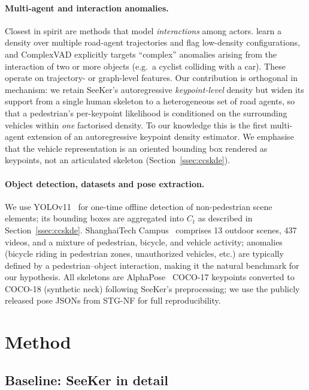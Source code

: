 \documentclass{article}
\begin{document}
\paragraph{Multi-agent and interaction anomalies.}
Closest in spirit are methods that model \emph{interactions} among actors.
\citet{wiederer2022anomaly} learn a density over multiple road-agent
trajectories and flag low-density configurations, and ComplexVAD
\citep{complexvad2025} explicitly targets ``complex'' anomalies arising from the
interaction of two or more objects (e.g.\ a cyclist colliding with a car). These
operate on trajectory- or graph-level features. Our contribution is orthogonal
in mechanism: we retain SeeKer's autoregressive \emph{keypoint-level} density but
widen its support from a single human skeleton to a heterogeneous set of road
agents, so that a pedestrian's per-keypoint likelihood is conditioned on the
surrounding vehicles within \emph{one} factorised density. To our knowledge this
is the first multi-agent extension of an autoregressive keypoint density
estimator. We emphasise that the vehicle representation is an oriented bounding
box rendered as keypoints, not an articulated skeleton (Section~\ref{ssec:ccskde}).

\paragraph{Object detection, datasets and pose extraction.}
We use YOLOv11~\citep{ultralytics2024yolov11} for one-time offline detection
of non-pedestrian scene elements; its bounding boxes are aggregated into
$C_t$ as described in Section~\ref{ssec:ccskde}. ShanghaiTech
Campus~\citep{liu2018future} comprises 13 outdoor scenes, 437 videos, and a
mixture of pedestrian, bicycle, and vehicle activity; anomalies (bicycle
riding in pedestrian zones, unauthorized vehicles, etc.) are typically
defined by a pedestrian--object interaction, making it the natural benchmark
for our hypothesis. All skeletons are AlphaPose~\citep{fang2017rmpe}
COCO-17 keypoints converted to COCO-18 (synthetic neck) following SeeKer's
preprocessing; we use the publicly released pose JSONs from STG-NF for full
reproducibility.

\section{Method}
\label{sec:method}

\subsection{Baseline: SeeKer in detail}
\label{ssec:baseline}
\end{document}
